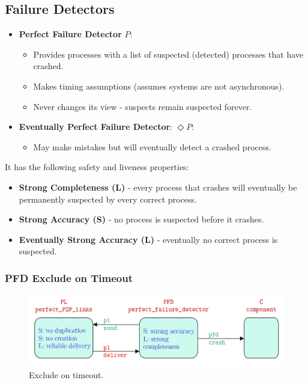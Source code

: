 \documentclass[11pt]{article}
\begin{document}
\subsection{Failure Detectors}
\begin{itemize}
  \item \textbf{Perfect Failure Detector} $P$:
    \begin{itemize}
      \item Provides processes with a list of suspected (detected) processes that have crashed.
      \item Makes timing assumptions (assumes systems are not asynchronous).
      \item Never changes its view - suspects remain suspected forever.
    \end{itemize}
  \item \textbf{Eventually Perfect Failure Detector}: $\Diamond P$:
    \begin{itemize}
      \item May make mistakes but will eventually detect a crashed process.
    \end{itemize}
\end{itemize}

It has the following safety and liveness properties:
\begin{itemize}
  \item \textbf{Strong Completeness (L)} - every process that crashes will eventually be permanently suspected by every correct process.
  \item \textbf{Strong Accuracy (S)} - no process is suspected before it crashes.
  \item \textbf{Eventually Strong Accuracy (L)} - eventually no correct process is suspected.
\end{itemize}

\subsubsection{PFD Exclude on Timeout}
\begin{figure}[htb!]
  \centering
  \caption{Exclude on timeout.}
  \includegraphics[scale=0.3]{pfd}
\end{figure}
\end{document}

